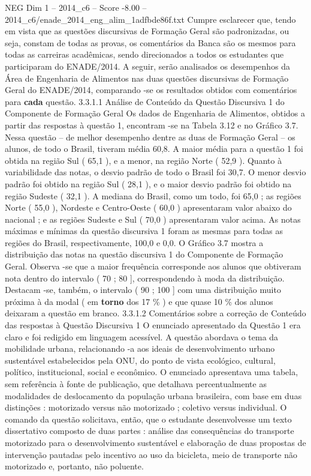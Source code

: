 \begin{textsample}{NEG Dim 1 – 2014\_c6 – Score -8.00 – 2014\_c6/enade\_2014\_eng\_alim\_1adfbde86f.txt}
Cumpre esclarecer que, tendo em vista que as questões discursivas de Formação Geral são padronizadas, ou seja, constam de todas as provas, os comentários da Banca são os mesmos para todas as carreiras acadêmicas, sendo direcionados a todos os estudantes que participaram do ENADE/2014.
A seguir, serão analisados os desempenhos da Área de Engenharia de Alimentos nas duas questões discursivas de Formação Geral do ENADE/2014, comparando -se os resultados obtidos com comentários para \textbf{cada} questão. 3.3.1.1 Análise de Conteúdo da Questão Discursiva 1 do Componente de Formação Geral Os dados de Engenharia de Alimentos, obtidos a partir das respostas à questão 1, encontram -se na Tabela 3.12 e no Gráfico 3.7.
Nessa questão – de melhor desempenho dentre as duas de Formação Geral – os alunos, de todo o Brasil, tiveram média 60,8.
A maior média para a questão 1 foi obtida na região Sul ( 65,1 ), e a menor, na região Norte ( 52,9 ).
Quanto à variabilidade das notas, o desvio padrão de todo o Brasil foi 30,7.
O menor desvio padrão foi obtido na região Sul ( 28,1 ), e o maior desvio padrão foi obtido na região Sudeste ( 32,1 ).
A mediana do Brasil, como um todo, foi 65,0 ; as regiões Norte ( 55,0 ), Nordeste e Centro-Oeste ( 60,0 ) apresentaram valor abaixo do nacional ; e as regiões Sudeste e Sul ( 70,0 ) apresentaram valor acima.
As notas máximas e mínimas da questão discursiva 1 foram as mesmas para todas as regiões do Brasil, respectivamente, 100,0 e 0,0.
O Gráfico 3.7 mostra a distribuição das notas na questão discursiva 1 do Componente de Formação Geral.
Observa -se que a maior frequência corresponde aos alunos que obtiveram nota dentro do intervalo ( 70 ; 80 ], correspondendo à moda da distribuição.
Destacam -se, também, o intervalo ( 90 ; 100 ] com uma distribuição muito próxima à da modal ( em \textbf{torno} dos 17 \% ) e que quase 10 \% dos alunos deixaram a questão em branco. 3.3.1.2 Comentários sobre a correção de Conteúdo das respostas à Questão Discursiva 1 O enunciado apresentado da Questão 1 era claro e foi redigido em linguagem acessível.
A questão abordava o tema da mobilidade urbana, relacionando -a aos ideais de desenvolvimento urbano sustentável estabelecidos pela ONU, do ponto de vista ecológico, cultural, político, institucional, social e econômico.
O enunciado apresentava uma tabela, sem referência à fonte de publicação, que detalhava percentualmente as modalidades de deslocamento da população urbana brasileira, com base em duas distinções : motorizado versus não motorizado ; coletivo versus individual.
O comando da questão solicitava, então, que o estudante desenvolvesse um texto dissertativo composto de duas partes : análise das consequências do transporte motorizado para o desenvolvimento sustentável e elaboração de duas propostas de intervenção pautadas pelo incentivo ao uso da bicicleta, meio de transporte não motorizado e, portanto, não poluente.

\end{textsample}

